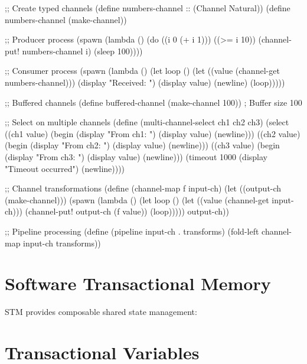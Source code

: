 \begin{example}[Channels]
\begin{lambdustcode}
;; Create typed channels
(define numbers-channel :: (Channel Natural))
(define numbers-channel (make-channel))

;; Producer process
(spawn 
  (lambda ()
    (do ((i 0 (+ i 1)))
        ((>= i 10))
      (channel-put! numbers-channel i)
      (sleep 100))))

;; Consumer process  
(spawn
  (lambda () 
    (let loop ()
      (let ((value (channel-get numbers-channel)))
        (display "Received: ") (display value) (newline)
        (loop)))))

;; Buffered channels
(define buffered-channel (make-channel 100))  ; Buffer size 100

;; Select on multiple channels  
(define (multi-channel-select ch1 ch2 ch3)
  (select  
    ((ch1 value) 
     (begin (display "From ch1: ") (display value) (newline)))
    ((ch2 value)
     (begin (display "From ch2: ") (display value) (newline))) 
    ((ch3 value)
     (begin (display "From ch3: ") (display value) (newline)))
    (timeout 1000
     (display "Timeout occurred") (newline))))

;; Channel transformations
(define (channel-map f input-ch)
  (let ((output-ch (make-channel)))
    (spawn 
      (lambda ()
        (let loop ()
          (let ((value (channel-get input-ch)))
            (channel-put! output-ch (f value))
            (loop)))))
    output-ch))

;; Pipeline processing
(define (pipeline input-ch . transforms)
  (fold-left channel-map input-ch transforms))
\end{lambdustcode}
\end{example}

\section{Software Transactional Memory}
\label{sec:stm}


STM provides composable shared state management:

\section{Transactional Variables}
\label{sec:tvars}

